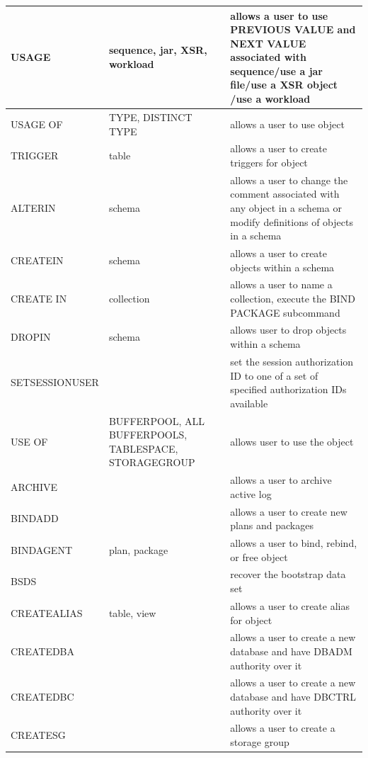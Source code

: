 \documentclass{article}
\begin{document}
\begin{itemize}
\begin{center}
\begin{longtable}{l |p{5cm}| p{7cm}}
USAGE & sequence, {\color{red}jar}, {\color{green}XSR}, {\color{green}workload} & allows a user to use PREVIOUS VALUE 
and NEXT VALUE associated with sequence/use a jar file/{\color{green}use a XSR object
/{\color{green}use a workload}} \\\hline
{\color{red}USAGE OF} & TYPE, DISTINCT TYPE & {\color{red}allows a user to use object} \\\hline
{\color{red}TRIGGER} & table & {\color{red}allows a user to create triggers for object}\\\hline
ALTERIN & schema & allows a user to change the comment associated with any object in a schema or
modify definitions of objects in a schema\\\hline
CREATEIN & schema & allows a user to create objects within a schema\\\hline
{\color{red}CREATE IN} & collection & {\color{red}allows a user to name a collection, execute the BIND PACKAGE subcommand} \\\hline
DROPIN  & schema & allows user to drop objects within a schema\\\hline
{\color{green}SETSESSIONUSER} & & {\color{green}set the session authorization ID to one of a set of 
specified authorization IDs available}\\\hline
{\color{red}USE OF}  & {\color{red}BUFFERPOOL, ALL BUFFERPOOLS, TABLESPACE, STORAGEGROUP} & 
{\color{red}allows user to use the object} \\\hline
{\color{red}ARCHIVE} & & {\color{red}allows a user to archive active log} \\\hline
{\color{red}BINDADD} & & {\color{red}allows a user to create new plans and packages} \\\hline
{\color{red} BINDAGENT} & plan, package & {\color{red} allows a user to bind, rebind, or free object} \\\hline
{\color{red}BSDS} &  & {\color{red} recover the bootstrap data set} \\\hline
{\color{red} CREATEALIAS} & table, view & {\color{red} allows a user to create alias for object} \\\hline
{\color{red} CREATEDBA} & & {\color{red} allows a user to create a new database and have DBADM authority over it} \\\hline
{\color{red} CREATEDBC} & & {\color{red} allows a user to create a new database and have DBCTRL authority
over it} \\\hline
{\color{red} CREATESG} & & {\color{red} allows a user to create a storage group} \\\hline

\end{longtable}
\end{center}
\end{itemize}
\end{document}
